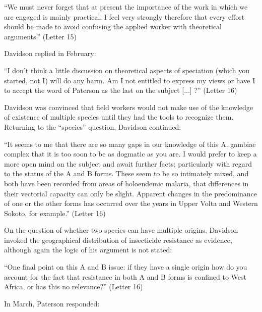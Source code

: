 \documentclass[a4paper,11pt,abstracton,hidelinks]{scrartcl}
\begin{document}
\begin{displayquote}
``We must never forget that at present the importance of the work in which we are engaged is mainly practical. I feel very strongly therefore that every effort should be made to avoid confusing the applied worker with theoretical arguments.'' (Letter 15)
\end{displayquote}


Davidson replied in February:

\begin{displayquote}
``I don't think a little discussion on theoretical aspects of speciation (which you started, not I) will do any harm. Am I not entitled to express my views or have I to accept the word of Paterson as the last on the subject [...] ?'' (Letter 16)
\end{displayquote}


Davidson was convinced that field workers would not make use of the knowledge of existence of multiple species until they had the tools to recognize them. Returning to the ``species'' question, Davidson continued:


\begin{displayquote}
``It seems to me that there are so many gaps in our knowledge of this A. gambiae complex that it is too soon to be as dogmatic as you are. I would prefer to keep a more open mind on the subject and await further facts; particularly with regard to the status of the A and B forms. These seem to be so intimately mixed, and both have been recorded from areas of holoendemic malaria, that differences in their vectorial capacity can only be slight. Apparent changes in the predominance of one or the other forms has occurred over the years in Upper Volta and Western Sokoto, for example.'' (Letter 16)
\end{displayquote}


On the question of whether two species can have multiple origins, Davidson invoked the geographical distribution of insecticide resistance as evidence, although again the logic of his argument is not stated:

\begin{displayquote}
``One final point on this A and B issue: if they have a single origin how do you account for the fact that resistance in both A and B forms is confined to West Africa, or has this no relevance?'' (Letter 16)
\end{displayquote}


In March, Paterson responded:
\end{document}
